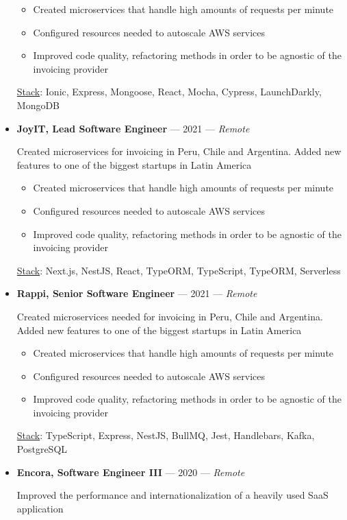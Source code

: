 \documentclass{resume}
\begin{document}
\begin{itemize}[leftmargin=*,itemsep=1ex]
    \begin{itemize}
      \item Created microservices that handle high amounts of requests per minute
      \item Configured resources needed to autoscale AWS services
      \item Improved code quality, refactoring methods in order to be agnostic of the invoicing provider
    \end{itemize}
    \underline{Stack}: Ionic, Express, Mongoose, React, Mocha, Cypress, LaunchDarkly, MongoDB
  \item 
    \textbf{JoyIT, Lead Software Engineer} --- 2021 --- \textit{Remote}
    \par 
    Created microservices for invoicing in Peru, Chile and Argentina. Added new features to one of the biggest startups in Latin America
    \begin{itemize}
      \item Created microservices that handle high amounts of requests per minute
      \item Configured resources needed to autoscale AWS services
      \item Improved code quality, refactoring methods in order to be agnostic of the invoicing provider
    \end{itemize}
    \underline{Stack}: Next.js, NestJS, React, TypeORM, TypeScript, TypeORM, Serverless
  \item 
    \textbf{Rappi, Senior Software Engineer} --- 2021 --- \textit{Remote}
    \par 
    Created microservices needed for invoicing in Peru, Chile and Argentina. Added new features to one of the biggest startups in Latin America
    \begin{itemize}
      \item Created microservices that handle high amounts of requests per minute
      \item Configured resources needed to autoscale AWS services
      \item Improved code quality, refactoring methods in order to be agnostic of the invoicing provider
    \end{itemize}
    \underline{Stack}: TypeScript, Express, NestJS, BullMQ, Jest, Handlebars, Kafka, PostgreSQL
  \item 
    \textbf{Encora, Software Engineer III} --- 2020 --- \textit{Remote}
    \par 
    Improved the performance and internationalization of a heavily used SaaS application

\end{itemize}
\end{document}
